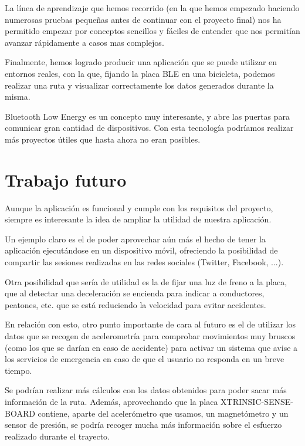 La línea de aprendizaje que hemos recorrido (en la que hemos empezado haciendo numerosas pruebas pequeñas antes de continuar con el proyecto final) nos ha permitido empezar por conceptos sencillos y fáciles de entender que nos permitían avanzar rápidamente a casos mas complejos.

Finalmente, hemos logrado producir una aplicación que se puede utilizar en entornos reales, con la que, fijando la placa BLE en una bicicleta, podemos realizar una ruta y visualizar correctamente los datos generados durante la misma.

Bluetooth Low Energy es un concepto muy interesante, y abre las puertas para comunicar gran cantidad de dispositivos. Con esta tecnología podríamos realizar más proyectos útiles que hasta ahora no eran posibles.

\section{Trabajo futuro}

Aunque la aplicación es funcional y cumple con los requisitos del proyecto, siempre es interesante la idea de ampliar la utilidad de nuestra aplicación.

Un ejemplo claro es el de poder aprovechar aún más el hecho de tener la aplicación ejecutándose en un dispositivo móvil, ofreciendo la posibilidad de compartir las sesiones realizadas en las redes sociales (Twitter, Facebook, ...).

Otra posibilidad que sería de utilidad es la de fijar una luz de freno a la placa, que al detectar una deceleración se encienda para indicar a conductores, peatones, etc. que se está reduciendo la velocidad para evitar accidentes.

En relación con esto, otro punto importante de cara al futuro es el de utilizar los datos que se recogen de acelerometría para comprobar movimientos muy bruscos (como los que se darían en caso de accidente) para activar un sistema que avise a los servicios de emergencia en caso de que el usuario no responda en un breve tiempo.

Se podrían realizar más cálculos con los datos obtenidos para poder sacar más información de la ruta. Además, aprovechando que la placa XTRINSIC-SENSE-BOARD contiene, aparte del acelerómetro que usamos, un magnetómetro y un sensor de presión, se podría recoger mucha más información sobre el esfuerzo realizado durante el trayecto.

